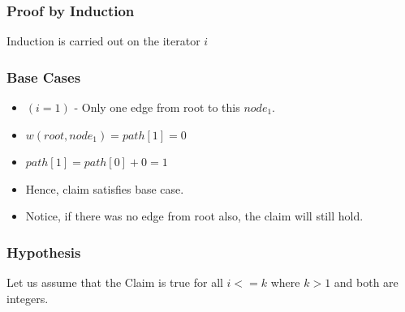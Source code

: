 \documentclass{article}
\begin{document}
\subsubsection{Proof by Induction}
Induction is carried out on the iterator $i$
\subsubsection{Base Cases}
\begin{itemize}
\item $(i=1)$ - Only one edge from root to this $node_1$. 
\item $w(root,node_1) = path[1] = 0$  
\item $path[1] = path[0] + 0 = 1$
\item Hence, claim satisfies base case.
\item Notice, if there was no edge from root also, the claim will still hold.
\end{itemize}
\subsubsection{Hypothesis}
Let us assume that the Claim is true for all $i<=k$ where $k>1$ and both are integers.
\end{document}
